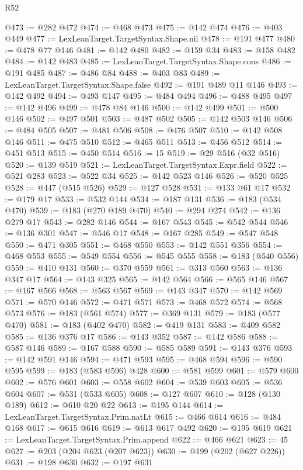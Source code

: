 \begin{lexlean}{R52}
\begin{coremodule}
@473 := @282 @472
@474 := @468 @473
@475 := @142 @474
@476 := @403 @449
@477 := LexLeanTarget.TargetSyntax.Shape.nil
@478 := @191 @477
@480 := @478 @77 @146
@481 := @142 @480
@482 := @159 @34
@483 := @158 @482
@484 := @142 @483
@485 := LexLeanTarget.TargetSyntax.Shape.cons
@486 := @191 @485
@487 := @486 @84
@488 := @403 @83
@489 := LexLeanTarget.TargetSyntax.Shape.false
@492 := @191 @489 @11 @146
@493 := @142 @492
@494 := @493 @147
@495 := @484 @494
@496 := @488 @495
@497 := @142 @496
@499 := @478 @84 @146
@500 := @142 @499
@501 := @500 @146
@502 := @497 @501
@503 := @487 @502
@505 := @142 @503 @146
@506 := @484 @505
@507 := @481 @506
@508 := @476 @507
@510 := @142 @508 @146
@511 := @475 @510
@512 := @465 @511
@513 := @456 @512
@514 := @451 @513
@515 := @450 @514
@516 := 15
@519 := @29 @516 (@32 @516)
@520 := @139 @519
@521 := LexLeanTarget.TargetSyntax.Expr.field
@522 := @521 @283
@523 := @522 @34
@525 := @142 @523 @146
@526 := @520 @525
@528 := @447 (@515 @526)
@529 := @127 @528
@531 := @133 @61 @17
@532 := @179 @17
@533 := @532 @144
@534 := @187 @131
@536 := @183 (@534 @470)
@539 := @183 (@270 @189 @470)
@540 := @294 @274
@542 := @136 @279 @17
@543 := @282 @146
@544 := @167 @543
@545 := @542 @544
@546 := @136 @301
@547 := @546 @17
@548 := @167 @285
@549 := @547 @548
@550 := @471 @305
@551 := @468 @550
@553 := @142 @551 @356
@554 := @468 @553
@555 := @549 @554
@556 := @545 @555
@558 := @183 (@540 @556)
@559 := @410 @131
@560 := @370 @559
@561 := @313 @560
@563 := @136 @347 @17
@564 := @143 @325
@565 := @142 @564
@566 := @565 @146
@567 := @167 @566
@568 := @563 @567
@569 := @143 @347
@570 := @142 @569
@571 := @570 @146
@572 := @471 @571
@573 := @468 @572
@574 := @568 @573
@576 := @183 (@561 @574)
@577 := @369 @131
@579 := @183 (@577 @470)
@581 := @183 (@402 @470)
@582 := @419 @131
@583 := @409 @582
@585 := @136 @376 @17
@586 := @143 @352
@587 := @142 @586
@588 := @587 @146
@589 := @167 @588
@590 := @585 @589
@591 := @143 @376
@593 := @142 @591 @146
@594 := @471 @593
@595 := @468 @594
@596 := @590 @595
@599 := @183 (@583 @596) @428
@600 := @581 @599
@601 := @579 @600
@602 := @576 @601
@603 := @558 @602
@604 := @539 @603
@605 := @536 @604
@607 := @531 (@533 @605)
@608 := @127 @607
@610 := @128 (@130 @189)
@612 := @610 @20 @22
@613 := @195 @144
@614 := LexLeanTarget.TargetSyntax.Prim.natLt
@615 := @466 @614
@616 := @484 @168
@617 := @615 @616
@619 := @613 @617 @492
@620 := @195 @619
@621 := LexLeanTarget.TargetSyntax.Prim.append
@622 := @466 @621
@623 := 45
@627 := @203 (@204 @623 (@207 @623))
@630 := @199 (@202 (@627 @226))
@631 := @198 @630
@632 := @197 @631

\end{coremodule}
\end{lexlean}
